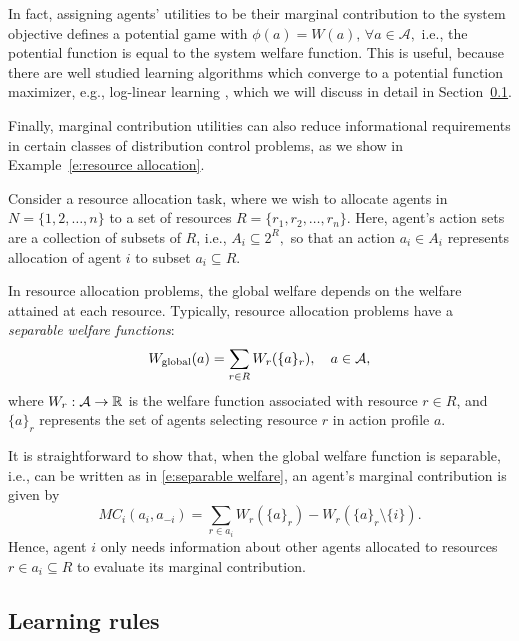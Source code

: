 In fact, assigning agents' utilities to be their marginal contribution to the system objective defines a potential game with $\phi(a) = W(a),\,\forall a\in \mathcal{A},$ i.e., the potential function is equal to the system welfare function. This is useful, because there are well studied learning algorithms which converge to a potential function maximizer, e.g., log-linear learning \cite{Blume1993}, which we will discuss in detail in Section~\ref{s:learning rules}. 


Finally, marginal contribution utilities can also reduce informational requirements in certain classes of distribution control problems, as we show in  Example~\ref{e:resource allocation}.

\begin{example}\label{e:resource allocation}
Consider a resource allocation task, where we wish to allocate agents in $N = \{1,2,\ldots, n\}$ to a set of resources $R = \{r_1,r_2,\ldots,r_n\}$. Here, agent's action sets are a collection of subsets of $R$, i.e., $A_i\subseteq 2^R,$ so that an action $a_i\in A_i$ represents allocation of agent $i$ to subset $a_i\subseteq R.$

In resource allocation problems, the global welfare depends on the welfare attained at each resource. Typically, resource allocation problems have a {\it separable welfare functions}:
\begin{equation}\label{e:separable welfare}W_{\rm global}(a) = \sum_{r\in R} W_r(\{a\}_r),\quad a\in\mathcal{A},\end{equation}
where $W_r:\mathcal{A}\to\mathbb{R}$ is the welfare function associated with resource $r\in R$, and $\{a\}_r$ represents the set of agents selecting resource $r$ in action profile $a$. 

It is straightforward to show that, when the global welfare function is separable, i.e., can be written as in \eqref{e:separable welfare}, an agent's marginal contribution is given by
$$MC_i(a_i,a_{-i}) = \sum_{r\in a_i}W_r\left(\{a\}_r\right) - W_r\left(\{a\}_r\setminus\{i\}\right).$$
Hence, agent $i$ only needs information about other agents allocated to resources $r\in a_i\subseteq R$ to evaluate its marginal contribution.
\end{example}


\subsection{Learning rules}\label{s:learning rules}

